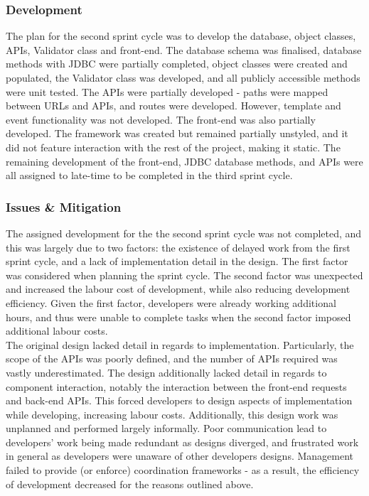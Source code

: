 \documentclass[9pt, titlepage]{extarticle}
\begin{document}
\subsubsection{Development}

The plan for the second sprint cycle was to develop the database, object classes, APIs, Validator class and front-end. The database schema was finalised, database methods with JDBC \cite{jdbc} were partially completed, object classes were created and populated, the Validator class was developed, and all publicly accessible methods were unit tested. The APIs were partially developed - paths were mapped between URLs and APIs, and routes were developed. However, template and event functionality was not developed. The front-end was also partially developed. The framework was created but remained partially unstyled, and it did not feature interaction with the rest of the project, making it static. The remaining development of the front-end, JDBC database methods, and APIs were all assigned to late-time to be completed in the third sprint cycle.

\subsubsection{Issues \& Mitigation}

The assigned development for the the second sprint cycle was not completed, and this was largely due to two factors: the existence of delayed work from the first sprint cycle, and a lack of implementation detail in the design. The first factor was considered when planning the sprint cycle. The second factor was unexpected and increased the labour cost of development, while also reducing development efficiency. Given the first factor, developers were already working additional hours, and thus were unable to complete tasks when the second factor imposed additional labour costs.\\

The original design lacked detail in regards to implementation. Particularly, the scope of the APIs was poorly defined, and the number of APIs required was vastly underestimated. The design additionally lacked detail in regards to component interaction, notably the interaction between the front-end requests and back-end APIs. This forced developers to design aspects of implementation while developing, increasing labour costs. Additionally, this design work was unplanned and performed largely informally. Poor communication lead to developers' work being made redundant as designs diverged, and frustrated work in general as developers were unaware of other developers designs. Management failed to provide (or enforce) coordination frameworks - as a result, the efficiency of development decreased for the reasons outlined above.\\
\end{document}
